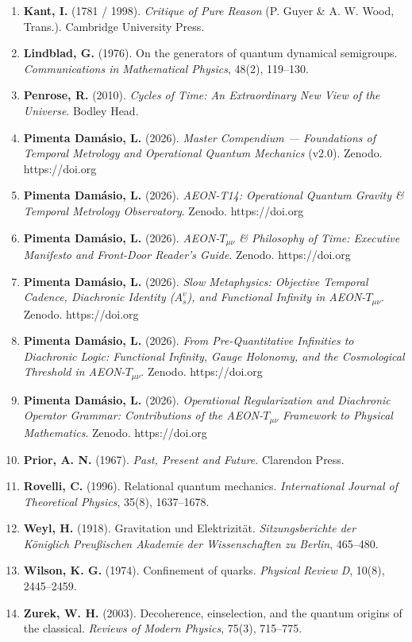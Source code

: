 \documentclass[
]{article}
\begin{document}
\begin{enumerate}
\item
  \textbf{Kant, I.} (1781 / 1998). \emph{Critique of Pure Reason} (P.
  Guyer \& A. W. Wood, Trans.). Cambridge University Press.
\item
  \textbf{Lindblad, G.} (1976). On the generators of quantum dynamical
  semigroups. \emph{Communications in Mathematical Physics}, 48(2),
  119--130.
\item
  \textbf{Penrose, R.} (2010). \emph{Cycles of Time: An Extraordinary
  New View of the Universe}. Bodley Head.
\item
  \textbf{Pimenta Damásio, L.} (2026). \emph{Master Compendium ---
  Foundations of Temporal Metrology and Operational Quantum Mechanics}
  (v2.0). Zenodo. https://doi.org
\item
  \textbf{Pimenta Damásio, L.} (2026). \emph{AEON-T14: Operational
  Quantum Gravity \& Temporal Metrology Observatory}. Zenodo.
  https://doi.org
\item
  \textbf{Pimenta Damásio, L.} (2026). \emph{AEON-\(T_{\mu\nu}\) \&
  Philosophy of Time: Executive Manifesto and Front-Door Reader's
  Guide}. Zenodo. https://doi.org
\item
  \textbf{Pimenta Damásio, L.} (2026). \emph{Slow Metaphysics: Objective
  Temporal Cadence, Diachronic Identity (\(A_s^v\)), and Functional
  Infinity in AEON-\(T_{\mu\nu}\)}. Zenodo. https://doi.org
\item
  \textbf{Pimenta Damásio, L.} (2026). \emph{From Pre-Quantitative
  Infinities to Diachronic Logic: Functional Infinity, Gauge Holonomy,
  and the Cosmological Threshold in AEON-\(T_{\mu\nu}\)}. Zenodo.
  https://doi.org
\item
  \textbf{Pimenta Damásio, L.} (2026). \emph{Operational Regularization
  and Diachronic Operator Grammar: Contributions of the
  AEON-\(T_{\mu\nu}\) Framework to Physical Mathematics}. Zenodo.
  https://doi.org
\item
  \textbf{Prior, A. N.} (1967). \emph{Past, Present and Future}.
  Clarendon Press.
\item
  \textbf{Rovelli, C.} (1996). Relational quantum mechanics.
  \emph{International Journal of Theoretical Physics}, 35(8),
  1637--1678.
\item
  \textbf{Weyl, H.} (1918). Gravitation und Elektrizität.
  \emph{Sitzungsberichte der Königlich Preußischen Akademie der
  Wissenschaften zu Berlin}, 465--480.
\item
  \textbf{Wilson, K. G.} (1974). Confinement of quarks. \emph{Physical
  Review D}, 10(8), 2445--2459.
\item
  \textbf{Zurek, W. H.} (2003). Decoherence, einselection, and the
  quantum origins of the classical. \emph{Reviews of Modern Physics},
  75(3), 715--775.
\end{enumerate}
\end{document}
